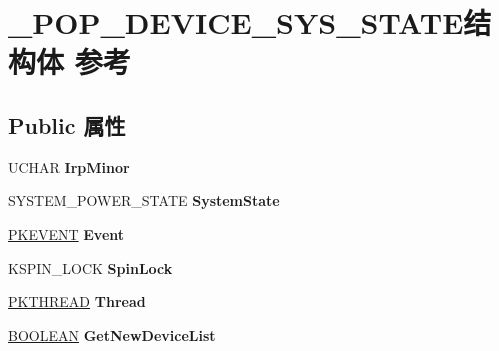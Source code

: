 \hypertarget{struct___p_o_p___d_e_v_i_c_e___s_y_s___s_t_a_t_e}{}\section{\+\_\+\+P\+O\+P\+\_\+\+D\+E\+V\+I\+C\+E\+\_\+\+S\+Y\+S\+\_\+\+S\+T\+A\+T\+E结构体 参考}
\label{struct___p_o_p___d_e_v_i_c_e___s_y_s___s_t_a_t_e}
\subsection*{Public 属性}
\begin{DoxyCompactItemize}
\item 
\mbox{\label{struct___p_o_p___d_e_v_i_c_e___s_y_s___s_t_a_t_e_a85a0e9deb995797e72d5b9c40978f38d}} 
U\+C\+H\+AR {\bfseries Irp\+Minor}
\item 
\mbox{\label{struct___p_o_p___d_e_v_i_c_e___s_y_s___s_t_a_t_e_ab3c47ff14d7bd8ed7baa14348d3c72ad}} 
S\+Y\+S\+T\+E\+M\+\_\+\+P\+O\+W\+E\+R\+\_\+\+S\+T\+A\+TE {\bfseries System\+State}
\item 
\mbox{\label{struct___p_o_p___d_e_v_i_c_e___s_y_s___s_t_a_t_e_a986b828bfd200e496193d0db4f5269c0}} 
\hyperlink{struct___k_e_v_e_n_t}{P\+K\+E\+V\+E\+NT} {\bfseries Event}
\item 
\mbox{\label{struct___p_o_p___d_e_v_i_c_e___s_y_s___s_t_a_t_e_ad4d3ea9d35037b4b33deaa8c5a4db048}} 
K\+S\+P\+I\+N\+\_\+\+L\+O\+CK {\bfseries Spin\+Lock}
\item 
\mbox{\label{struct___p_o_p___d_e_v_i_c_e___s_y_s___s_t_a_t_e_ae4906ff31f3a52086e9343eb93228185}} 
\hyperlink{struct___k_t_h_r_e_a_d}{P\+K\+T\+H\+R\+E\+AD} {\bfseries Thread}
\item 
\mbox{\label{struct___p_o_p___d_e_v_i_c_e___s_y_s___s_t_a_t_e_a86515377601ec88fe00cfd837136bce5}} 
\hyperlink{_processor_bind_8h_a112e3146cb38b6ee95e64d85842e380a}{B\+O\+O\+L\+E\+AN} {\bfseries Get\+New\+Device\+List}

\end{DoxyCompactItemize}
